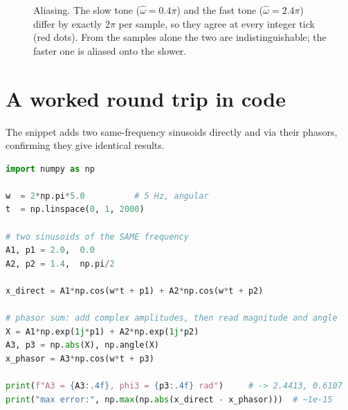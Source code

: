 \begin{figure}[H]
\centering
{}
\caption{Aliasing. The slow tone ($\hat\omega = 0.4\pi$) and the fast tone ($\hat\omega = 2.4\pi$) differ
by exactly $2\pi$ per sample, so they agree at every integer tick (red dots). From the samples
alone the two are indistinguishable; the faster one is aliased onto the slower.}
\label{ch04:fig-alias}
\end{figure}

\section{A worked round trip in code}
\label{ch04:code}

The snippet adds two same-frequency sinusoids directly and via their phasors, confirming they give identical results.

\begin{lstlisting}[language=Python,caption={Adding sinusoids: time-domain vs.\ phasor.},captionpos=b]
import numpy as np

w  = 2*np.pi*5.0          # 5 Hz, angular
t  = np.linspace(0, 1, 2000)

# two sinusoids of the SAME frequency
A1, p1 = 2.0,  0.0
A2, p2 = 1.4,  np.pi/2

x_direct = A1*np.cos(w*t + p1) + A2*np.cos(w*t + p2)

# phasor sum: add complex amplitudes, then read magnitude and angle
X = A1*np.exp(1j*p1) + A2*np.exp(1j*p2)
A3, p3 = np.abs(X), np.angle(X)
x_phasor = A3*np.cos(w*t + p3)

print(f"A3 = {A3:.4f}, phi3 = {p3:.4f} rad")     # -> 2.4413, 0.6107
print("max error:", np.max(np.abs(x_direct - x_phasor)))  # ~1e-15
\end{lstlisting}

